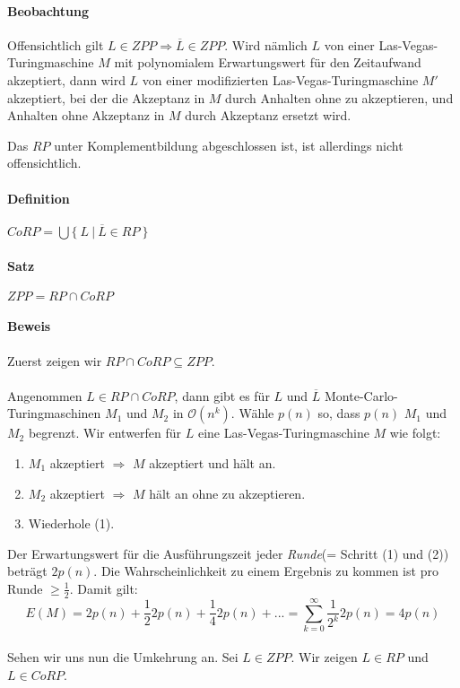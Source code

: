 \paragraph{Beobachtung}
Offensichtlich gilt $L \in ZPP \Rightarrow \overline{L} \in ZPP$.
Wird nämlich $L$ von einer Las-Vegas-Turingmaschine $M$ mit polynomialem Erwartungswert für den Zeitaufwand akzeptiert, dann wird $L$ von einer modifizierten Las-Vegas-Turingmaschine $M'$ akzeptiert, bei der die Akzeptanz in $M$ durch Anhalten ohne zu akzeptieren, und Anhalten ohne Akzeptanz in $M$ durch Akzeptanz ersetzt wird.

Das $RP$ unter Komplementbildung abgeschlossen ist, ist allerdings nicht offensichtlich.

\paragraph{Definition}
$CoRP = \bigcup \bigl\{\ L\ \bigl\lvert\ \overline{L} \in RP\ \}$

\paragraph{Satz}
$ZPP = RP \cap CoRP$

\paragraph{Beweis}
Zuerst zeigen wir $RP \cap CoRP \subseteq ZPP$.\\
\\
Angenommen $L \in RP \cap CoRP$, dann gibt es für $L$ und $\overline{L}$ Monte-Carlo-Turingmaschinen $M_1$ und $M_2$ in $\mathcal{O}(n^k)$.
Wähle $p(n)$ so, dass $p(n)$ $M_1$ und $M_2$ begrenzt.
Wir entwerfen für $L$ eine Las-Vegas-Turingmaschine $M$ wie folgt:
\begin{enumerate}
	\item $M_1$ akzeptiert $\Rightarrow$ $M$ akzeptiert und hält an.
	\item $M_2$ akzeptiert $\Rightarrow$ $M$ hält an ohne zu akzeptieren.
	\item Wiederhole (1).
\end{enumerate}
Der Erwartungswert für die Ausführungszeit jeder \emph{Runde}(= Schritt (1) und (2)) beträgt $2p(n)$.
Die Wahrscheinlichkeit zu einem Ergebnis zu kommen ist pro Runde $\geq \frac{1}{2}$.
Damit gilt:
\begin{equation*}
	E(M) = 2p(n) + \frac{1}{2}2p(n) + \frac{1}{4}2p(n) + ... = \sum\limits_{k=0}^{\infty}\frac{1}{2^k}2p(n) = 4p(n)
\end{equation*}
\\
Sehen wir uns nun die Umkehrung an.
Sei $L \in ZPP$.
Wir zeigen $L \in RP$ und $L \in CoRP$.

